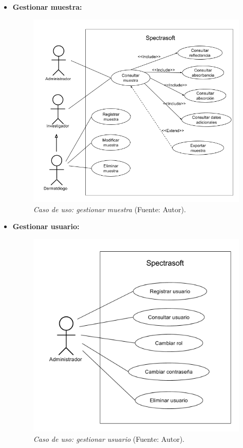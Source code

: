 \begin{itemize}
\newpage
		\item \textbf{Gestionar muestra:}
 	
 		\begin{figure}[H]
		\centering
		\includegraphics[scale=0.5]{img/cu-gestion-muestra.png}
			\caption[Caso de uso: gestionar muestra]{\textit{ Caso de uso: gestionar muestra} (Fuente: Autor).}
	\end{figure}
	
			\item \textbf{Gestionar usuario:}
 	
 		\begin{figure}[H]
		\centering
		\includegraphics[scale=0.5]{img/cu-gestion-usuario.png}
			\caption[Caso de uso: gestionar usuario]{\textit{ Caso de uso: gestionar usuario} (Fuente: Autor).}
	\end{figure}
	
 \end{itemize}
 
